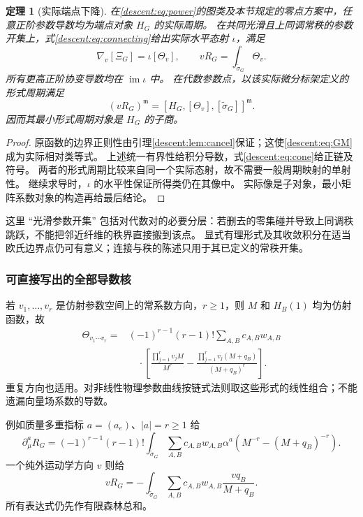 \documentclass[11pt,a4paper,oneside]{ctexart}
\theoremstyle{cnplain}
\newtheorem{theorem}{定理}[section]
\theoremstyle{definition}
\theoremstyle{remark}
\newcommand{\im}{\operatorname{im}}
\numberwithin{equation}{section}
\begin{document}
\begin{theorem}[实际端点下降]\label{descent:thm:descent}
在\eqref{descent:eq:power}的图类及本节规定的零点方案中，任意正阶参数导数均为端点对象 $H_G$ 的实际周期。
在共同光滑且上同调常秩的参数开集上，式\eqref{descent:eq:connecting}给出实际水平态射 $\iota$，满足
\begin{equation}\label{descent:eq:descent}
 \nabla_v[\Xi_G]=\iota[\Theta_v],\qquad
 vR_G=\int_{\widetilde\sigma_G}\Theta_v.
\end{equation}
所有更高正阶协变导数均在 $\im\iota$ 中。
在代数参数点，以该实际微分标架定义的形式周期满足
\begin{equation}\label{descent:eq:motivic}
 (vR_G)^{\mathfrak m}
     =[H_G,[\Theta_v],[\widetilde\sigma_G]]^{\mathfrak m}.
\end{equation}
因而其最小形式周期对象是 $H_G$ 的子商。
\end{theorem}
\begin{proof}
原函数的边界正则性由引理\ref{descent:lem:cancel}保证；这使\eqref{descent:eq:GM}成为实际相对类等式。
上述统一有界性给积分导数，式\eqref{descent:eq:cone}给正链及符号。
两者的形式周期比较来自同一个实际态射，故不需要一般周期映射的单射性。
继续求导时，$\iota$ 的水平性保证所得类仍在其像中。
实际像是子对象，最小矩阵系数对象的构造再给最后结论。
\end{proof}

这里 ``光滑参数开集'' 包括对代数对的必要分层：若删去的零集碰并导致上同调秩跳跃，不能把邻近纤维的秩界直接搬到该点。
显式有理形式及其收敛积分在适当欧氏边界点仍可有意义；连接与秩的陈述只用于其已定义的常秩开集。

\subsubsection{可直接写出的全部导数核}
若 $v_1,\ldots,v_r$ 是仿射参数空间上的常系数方向，$r\geq1$，则 $M$ 和 $H_B(1)$ 均为仿射函数，故
\begin{align}\label{descent:eq:allorders}
 \Theta_{v_1\cdots v_r}
 ={}&(-1)^{r-1}(r-1)!\sum_{A,B}c_{A,B}w_{A,B}\nonumber\\[-2pt]
 &\quad\cdot\left[
 \frac{\prod_{j=1}^r v_jM}{M^r}
 -\frac{\prod_{j=1}^r v_j(M+q_B)}{(M+q_B)^r}
 \right].
\end{align}
重复方向也适用。对非线性物理参数曲线按链式法则取这些形式的线性组合；不能遗漏向量场系数的导数。

例如质量多重指标 $a=(a_e)$、$|a|=r\geq1$ 给
\begin{equation}\label{descent:eq:massderivative}
 \partial_\mu^a R_G
 =(-1)^{r-1}(r-1)!\int_{\widetilde\sigma_G}
   \sum_{A,B}c_{A,B}w_{A,B}\alpha^a
       \left(M^{-r}-(M+q_B)^{-r}\right).
\end{equation}
一个纯外运动学方向 $v$ 则给
\begin{equation}\label{descent:eq:kinematic}
 vR_G=-\int_{\widetilde\sigma_G}
             \sum_{A,B}c_{A,B}w_{A,B}\frac{vq_B}{M+q_B}.
\end{equation}
所有表达式仍先作有限森林总和。
\end{document}
